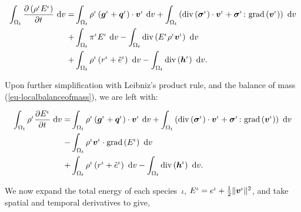 \begin{equation*}
\begin{split}
\int_{\Omega_{t}} \frac{\partial \left(\rho^{\iota}
  E^{\iota}\right)}{\partial t} \ \mathrm{d}v = & \int_{\Omega_{t}}
\rho^{\iota} \left(\mbox{\boldmath$ g$}^{\iota} +
\mbox{\boldmath$ q$}^{\iota}\right)\cdot\mbox{\boldmath$ v$}^{\iota}\ \mathrm{d}v + \int_{\Omega_{t}}
\left(\mathrm{div}\left(\mbox{\boldmath$\sigma$}^{\iota}\right)\cdot\mbox{\boldmath$ v$}^{\iota} +
\mbox{\boldmath$\sigma$}^{\iota}\colon\mathrm{grad}\left(\mbox{\boldmath$ v$}^{\iota}\right)
\right)\ \mathrm{d}v\\ + & \int_{\Omega_{t}}
\pi^{\iota}E^{\iota}\ \mathrm{d}v - \int_{\Omega_{t}}
\mathrm{div}\left(E^{\iota} \rho^{\iota}
\mbox{\boldmath$ v$}^{\iota}\right)\ \mathrm{d}v \\ + &\int_{\Omega_{t}} \rho^{\iota}
\left(r^{\iota} + \tilde{e}^{\iota} \right)\ \mathrm{d}v -
\int_{\Omega_{t}} \mathrm{div}\left(\mbox{\boldmath$ h$}^{\iota}\right)\ \mathrm{d}v.
\end{split}
\end{equation*}

\noindent Upon further simplification with Leibniz's product rule, and
the balance of mass (\ref{eu-localbalanceofmass}), we are left with:

\begin{equation*}
\begin{split}
\int_{\Omega_{t}} \rho^{\iota} \frac{\partial E^{\iota}}{\partial
  t}\ \mathrm{d}v = & \int_{\Omega_{t}} \rho^{\iota} \left(\mbox{\boldmath$ g$}^{\iota}
+ \mbox{\boldmath$ q$}^{\iota}\right)\cdot\mbox{\boldmath$ v$}^{\iota}\ \mathrm{d}v + \int_{\Omega_{t}}
\left(\mathrm{div}\left(\mbox{\boldmath$\sigma$}^{\iota}\right)\cdot\mbox{\boldmath$ v$}^{\iota} +
\mbox{\boldmath$\sigma$}^{\iota}\colon\mathrm{grad}\left(\mbox{\boldmath$ v$}^{\iota}\right)
\right)\ \mathrm{d}v\\ - & \int_{\Omega_{t}} \rho^{\iota}\mbox{\boldmath$ v$}^{\iota}
\cdot \mathrm{grad}\left( E^{\iota} \right)\ \mathrm{d}v \\ +
&\int_{\Omega_{t}} \rho^{\iota} \left(r^{\iota} + \tilde{e}^{\iota}
\right)\ \mathrm{d}v - \int_{\Omega_{t}}
\mathrm{div}\left(\mbox{\boldmath$ h$}^{\iota}\right)\ \mathrm{d}v.
\end{split}
\end{equation*}

We now expand the total energy of each species~$\iota$, $E^{\iota} =
e^\iota + \frac{1}{2} \Vert\mbox{\boldmath$ v$}^\iota\Vert^2$, and take spatial and
temporal derivatives to give,

